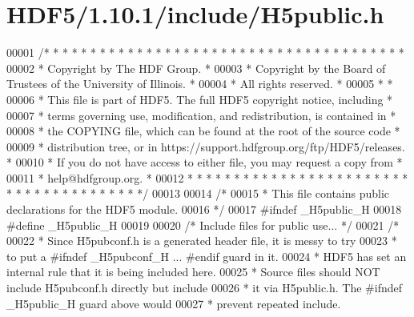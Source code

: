 \hypertarget{_h_d_f5_21_810_81_2include_2_h5public_8h_source}{}\section{H\+D\+F5/1.10.1/include/\+H5public.h}
\label{_h_d_f5_21_810_81_2include_2_h5public_8h_source}

\begin{DoxyCode}
00001 \textcolor{comment}{/* * * * * * * * * * * * * * * * * * * * * * * * * * * * * * * * * * * * * * *}
00002 \textcolor{comment}{ * Copyright by The HDF Group.                                               *}
00003 \textcolor{comment}{ * Copyright by the Board of Trustees of the University of Illinois.         *}
00004 \textcolor{comment}{ * All rights reserved.                                                      *}
00005 \textcolor{comment}{ *                                                                           *}
00006 \textcolor{comment}{ * This file is part of HDF5.  The full HDF5 copyright notice, including     *}
00007 \textcolor{comment}{ * terms governing use, modification, and redistribution, is contained in    *}
00008 \textcolor{comment}{ * the COPYING file, which can be found at the root of the source code       *}
00009 \textcolor{comment}{ * distribution tree, or in https://support.hdfgroup.org/ftp/HDF5/releases.  *}
00010 \textcolor{comment}{ * If you do not have access to either file, you may request a copy from     *}
00011 \textcolor{comment}{ * help@hdfgroup.org.                                                        *}
00012 \textcolor{comment}{ * * * * * * * * * * * * * * * * * * * * * * * * * * * * * * * * * * * * * * */}
00013 
00014 \textcolor{comment}{/*}
00015 \textcolor{comment}{ * This file contains public declarations for the HDF5 module.}
00016 \textcolor{comment}{ */}
00017 \textcolor{preprocessor}{#ifndef \_H5public\_H}
00018 \textcolor{preprocessor}{#define \_H5public\_H}
00019 
00020 \textcolor{comment}{/* Include files for public use... */}
00021 \textcolor{comment}{/*}
00022 \textcolor{comment}{ * Since H5pubconf.h is a generated header file, it is messy to try}
00023 \textcolor{comment}{ * to put a #ifndef \_H5pubconf\_H ... #endif guard in it.}
00024 \textcolor{comment}{ * HDF5 has set an internal rule that it is being included here.}
00025 \textcolor{comment}{ * Source files should NOT include H5pubconf.h directly but include}
00026 \textcolor{comment}{ * it via H5public.h.  The #ifndef \_H5public\_H guard above would}
00027 \textcolor{comment}{ * prevent repeated include.}

\end{DoxyCode}
